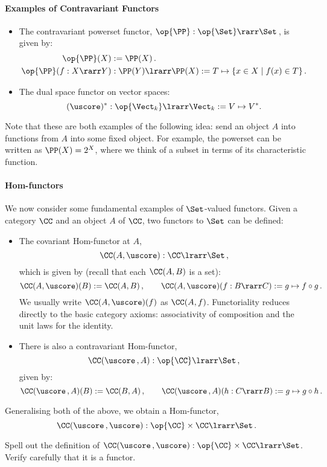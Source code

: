 \documentclass{svmult}
\begin{document}
\paragraph{Examples of Contravariant Functors}
\begin{itemize}
\item The contravariant powerset functor, $\op{\PP}: \op{\Set}\rarr \Set$\,, is given by:
\begin{align*}
\op{\PP}(X)&:=\PP(X)\,. \\
\op{\PP}(f:X\rarr Y) &: \PP(Y) \lrarr \PP(X) := T \mapsto \{ x \in X \mid f(x) \in T \}\,.
\end{align*}
\item The dual space functor on vector spaces:
\[  (\uscore)^{*}:\op{\Vect_k} \lrarr \Vect_k := V \mapsto V^{*} . \]
\end{itemize}
%
Note that these are both examples of the following idea: send an object $A$ into functions from $A$ into some fixed object. For example, the powerset can be written as $\PP(X) = 2^{X}$, where we think of a subset in terms of its characteristic function.

\paragraph{Hom-functors} We now consider some fundamental examples of $\Set$-valued functors. Given a category $\CC$ and an object $A$ of $\CC$, two  functors to $\Set$ can be defined:
\begin{itemize}
\item The covariant Hom-functor at $A$,
\[ \CC (A,\uscore) : \CC \lrarr \Set\,, \]
which is given by (recall that each $\CC(A,B)$ is a set):
\[  \CC (A,\uscore)(B) :=  \CC (A, B)\,, \qquad \CC (A,\uscore)(f : B \rarr C) := g \mapsto f \circ g\,. \]
We usually write $\CC(A,\uscore)(f)$ as $\CC(A,f)$. Functoriality reduces directly to the basic category axioms: associativity of composition and the unit laws for the
identity.
\item There is also a contravariant Hom-functor,
\[ \CC (\uscore\,,A) : \op{\CC} \lrarr \Set\,, \]
given by:
\[ \CC (\uscore\,,A)(B) := \CC (B,A)\,, \qquad \CC (\uscore\,,A)(h : C \rarr B) := g \mapsto g \circ h\,. \]
\end{itemize}
Generalising both of the above, we obtain a  Hom-functor,
\[ \CC(\uscore\,,\uscore) : \op{\CC} \times \CC \lrarr \Set\,. \]
\begin{myexercise}
Spell out  the definition of $\CC(\uscore\,,\uscore) : \op{\CC} \times \CC \lrarr \Set$. Verify carefully that it is a functor.
\end{myexercise}
\end{document}

